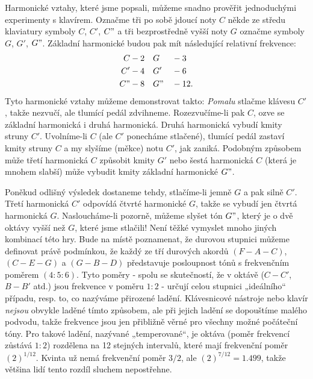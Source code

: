   Harmonické vztahy, které jsme popsali, můžeme snadno prověřit jednoduchými experimenty s 
  klavírem. Označme tři po sobě jdoucí noty \(C\) někde ze středu klaviatury symboly \(C\), \(C'\), 
  \(C"\) a tři bezprostředně vyšší noty \(G\) označme symboly \(G\), \(G'\), \(G"\). Základní 
  harmonické budou pak mít následující relativní frekvence:
  \begin{alignat*}{2}
    C  &-2 \quad G  &&-3    \\
    C' &-4 \quad G' &&-6    \\
    C" &-8 \quad G" &&-12.  
  \end{alignat*}
  Tyto harmonické vztahy můžeme demonstrovat takto: \emph{Pomalu} stlačme klávesu \(C'\), takže 
  nezvučí, ale tlumící pedál zdvihneme. Rozezvučíme-li pak \(C\), ozve se základní harmonická i 
  druhá harmonická. Druhá harmonická vybudí kmity struny \(C'\). Uvolníme-li \(C\) (ale \(C'\) 
  ponecháme stlačené), tlumící pedál zastaví kmity struny \(C\) a my slyšíme (měkce) notu \(C'\), 
  jak zaniká. Podobným způsobem může třetí harmonická \(C\) způsobit kmity \(G'\) nebo šestá 
  harmonická \(C\) (která je mnohem slabší) může vybudit kmity základní harmonické \(G"\). 
  
  Poněkud odlišný výsledek dostaneme tehdy, stlačíme-li jemně \(G\) a pak silně \(C'\). Třetí 
  harmonická \(C'\) odpovídá čtvrté harmonické \(G\), takže se vybudí jen čtvrtá harmonická 
  \(G\). Nasloucháme-li pozorně, můžeme slyšet tón \(G"\), který je o dvě oktávy vyšší než \(G\), 
  které jsme stlačili! Není těžké vymyslet mnoho jiných kombinací této hry. Bude na místě 
  poznamenat, že durovou stupnici můžeme definovat právě podmínkou, že každý ze tří durových akordů 
  \((F-A-C)\), \((C-E-G)\) a \((G-B-D)\) představuje posloupnost tónů s frekvenčním poměrem \((4: 
  5:6)\). Tyto poměry - spolu se skutečností, že v oktávě (\(C-C'\), \(B-B'\) atd.) jsou frekvence 
  v poměru \(1:2\) - určují celou stupnici „ideálního“ případu, resp. to, co nazýváme přirozené 
  ladění. Klávesnicové nástroje nebo klavír \emph{nejsou} obvykle laděné tímto způsobem, ale při 
  jejich ladění se dopouštíme malého podvodu, takže frekvence jsou jen přibližně věrné pro všechny 
  možné počáteční tóny. Pro takové ladění, nazývané „temperované“, je oktáva (poměr frekvencí 
  zůstává \(1:2\)) rozdělena na \num{12} stejných intervalů, které mají frekvenční poměr 
  \((2)^{1/12}\). Kvinta už nemá frekvenční poměr \(3/2\), ale \((2)^{7/12} = \num{1.499}\), takže 
  většina lidí tento rozdíl sluchem nepostřehne.
  
